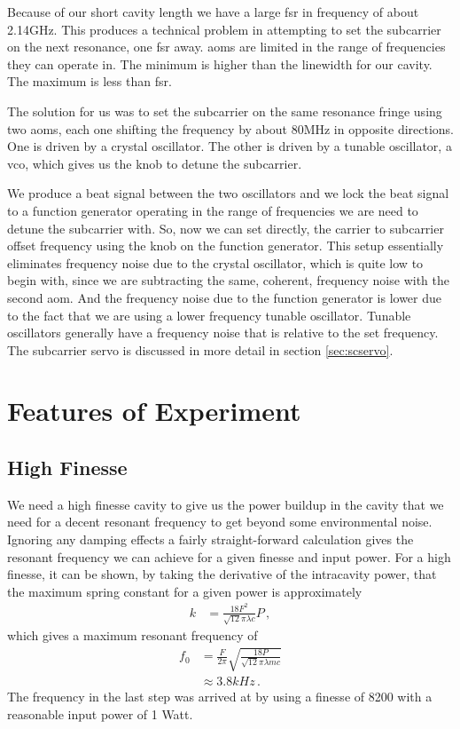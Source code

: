 Because of our short cavity length we have a large \ac{fsr} in frequency of
about 2.14GHz.
This produces a technical problem in attempting to set the
subcarrier on the next resonance, one \ac{fsr} away.
\ac{aom}s are limited in the range of frequencies they can operate in.
The minimum is higher than the linewidth for our cavity.
The maximum is less than \ac{fsr}.

The solution for us was to set the subcarrier on the same resonance fringe
using two \ac{aom}s, each one shifting the frequency by about 80MHz in
opposite directions.
One is driven by a crystal oscillator.
The other is driven by a tunable oscillator, a \ac{vco}, which gives us the
knob to detune the subcarrier.

We produce a beat signal between the two oscillators and we lock the beat
signal to a function generator operating in the range of frequencies we are
need to detune the subcarrier with. So, now we can set directly, the carrier
to subcarrier offset frequency using the knob on the function generator.
This setup essentially eliminates frequency noise due to the crystal
oscillator, which is quite low to begin with, since we are subtracting the
same, coherent, frequency noise with the second \ac{aom}.
And the frequency noise due to the function generator is lower due to the
fact that we are using a lower frequency tunable oscillator.
Tunable oscillators generally have a frequency noise that is relative to the
set frequency.
The subcarrier servo is discussed in more detail in section
\ref{sec:scservo}.

\section{Features of Experiment}
\subsection{High Finesse}
We need a high finesse cavity to give us the power buildup in the cavity that
we need for a decent resonant frequency to get beyond some environmental noise.
Ignoring any damping effects a fairly straight-forward calculation gives the
resonant frequency we can achieve for a given finesse and input power. For a
high finesse, it can be shown, by taking the derivative of the intracavity power,
that the maximum spring constant for a given power is approximately
\begin{align}
k &= \frac{18 F^2}{\sqrt{12} \pi \lambda c} P \,,
\end{align}
which gives a maximum resonant frequency of
\begin{align}
f_0 &= \frac{F}{2 \pi} \sqrt{\frac{18 P}{\sqrt{12} \pi \lambda m c }} \\
&\approx 3.8kHz \,.
\end{align}
The frequency in the last step was arrived at by using a finesse of 8200
with a reasonable input power of 1 Watt.

